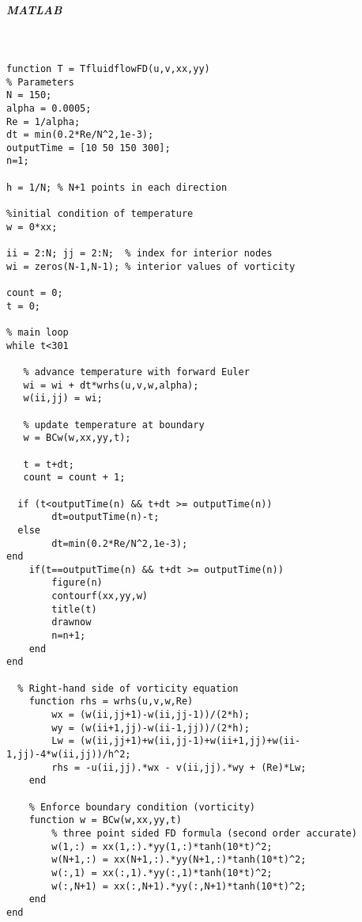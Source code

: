 \subparagraph*{MATLAB}
    \begin{verbatim}


function T = TfluidflowFD(u,v,xx,yy)
% Parameters
N = 150;
alpha = 0.0005;
Re = 1/alpha;
dt = min(0.2*Re/N^2,1e-3);
outputTime = [10 50 150 300];
n=1;

h = 1/N; % N+1 points in each direction

%initial condition of temperature
w = 0*xx;

ii = 2:N; jj = 2:N;  % index for interior nodes
wi = zeros(N-1,N-1); % interior values of vorticity

count = 0;
t = 0;

% main loop
while t<301

   % advance temperature with forward Euler
   wi = wi + dt*wrhs(u,v,w,alpha);
   w(ii,jj) = wi;

   % update temperature at boundary
   w = BCw(w,xx,yy,t);

   t = t+dt;
   count = count + 1;

  if (t<outputTime(n) && t+dt >= outputTime(n))
        dt=outputTime(n)-t;
  else
        dt=min(0.2*Re/N^2,1e-3);
end
    if(t==outputTime(n) && t+dt >= outputTime(n))
        figure(n)
        contourf(xx,yy,w)
        title(t)
        drawnow
        n=n+1;
    end
end

  % Right-hand side of vorticity equation
    function rhs = wrhs(u,v,w,Re)
        wx = (w(ii,jj+1)-w(ii,jj-1))/(2*h);
        wy = (w(ii+1,jj)-w(ii-1,jj))/(2*h);
        Lw = (w(ii,jj+1)+w(ii,jj-1)+w(ii+1,jj)+w(ii-1,jj)-4*w(ii,jj))/h^2;
        rhs = -u(ii,jj).*wx - v(ii,jj).*wy + (Re)*Lw;
    end

    % Enforce boundary condition (vorticity)
    function w = BCw(w,xx,yy,t)
        % three point sided FD formula (second order accurate)
        w(1,:) = xx(1,:).*yy(1,:)*tanh(10*t)^2;
        w(N+1,:) = xx(N+1,:).*yy(N+1,:)*tanh(10*t)^2;
        w(:,1) = xx(:,1).*yy(:,1)*tanh(10*t)^2;
        w(:,N+1) = xx(:,N+1).*yy(:,N+1)*tanh(10*t)^2;
    end
end
\end{verbatim}